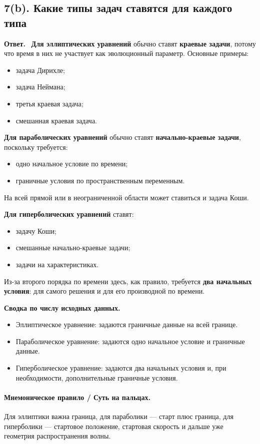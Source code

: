 \documentclass[a4paper,12pt]{article}
\newcommand{\Answer}{\textbf{Ответ.}\ }
\begin{document}
\subsection*{7(b). Какие типы задач ставятся для каждого типа}

\Answer
\textbf{Для эллиптических уравнений} обычно ставят \textbf{краевые задачи}, потому что время в них не участвует как эволюционный параметр. Основные примеры:
\begin{itemize}
  \item задача Дирихле;
  \item задача Неймана;
  \item третья краевая задача;
  \item смешанная краевая задача.
\end{itemize}

\textbf{Для параболических уравнений} обычно ставят \textbf{начально-краевые задачи}, поскольку требуется:
\begin{itemize}
  \item одно начальное условие по времени;
  \item граничные условия по пространственным переменным.
\end{itemize}
На всей прямой или в неограниченной области может ставиться и задача Коши.

\textbf{Для гиперболических уравнений} ставят:
\begin{itemize}
  \item задачу Коши;
  \item смешанные начально-краевые задачи;
  \item задачи на характеристиках.
\end{itemize}
Из-за второго порядка по времени здесь, как правило, требуется \textbf{два начальных условия}: для самого решения и для его производной по времени.

\textbf{Сводка по числу исходных данных.}
\begin{itemize}
  \item Эллиптическое уравнение: задаются граничные данные на всей границе.
  \item Параболическое уравнение: задаются одно начальное условие и граничные данные.
  \item Гиперболическое уравнение: задаются два начальных условия и, при необходимости, дополнительные граничные условия.
\end{itemize}

\paragraph{Мнемоническое правило / Суть на пальцах.}
Для эллиптики важна граница, для параболики --- старт плюс граница, для гиперболики --- стартовое положение, стартовая скорость и дальше уже геометрия распространения волны.
\end{document}
